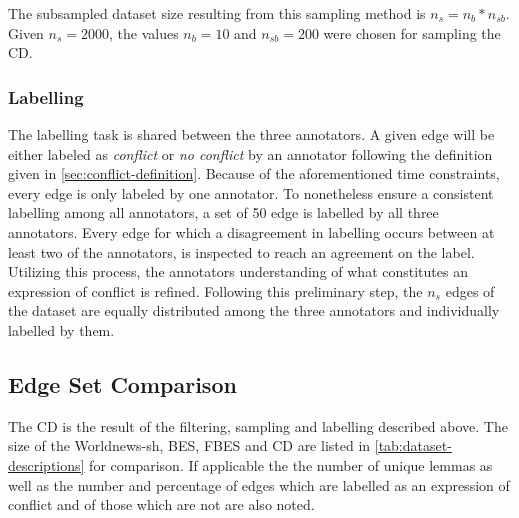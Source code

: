 \documentclass[11pt]{scrreprt}
\begin{document}
{The subsampled dataset size resulting from this sampling method is \(n_{s} = n_{b} * n_{sb}\). Given \(n_{s} = 2000\), the values \(n_b = 10\) and \(n_{sb} = 200\) were chosen for sampling the CD.


\subsubsection{Labelling}
The labelling task is shared between the three annotators. A given edge will be either labeled as \textit{conflict} or \textit{no conflict} by an annotator following the definition given in \cref{sec:conflict-definition}. Because of the aforementioned time constraints, every edge is only labeled by one annotator. To nonetheless ensure a consistent labelling among all annotators, a set of 50 edge is labelled by all three annotators. Every edge for which a disagreement in labelling occurs between at least two of the annotators, is inspected to reach an agreement on the label. Utilizing this process, the annotators understanding of what constitutes an expression of conflict is refined. Following this preliminary step, the \(n_s\) edges of the dataset are equally distributed among the three annotators and individually labelled by them.


\subsection{Edge Set Comparison}
The CD is the result of the filtering, sampling and labelling described above. The size of the Worldnews-\gls{sh}, BES, FBES and CD are listed in \cref{tab:dataset-descriptions} for comparison. If applicable the the number of unique lemmas as well as the number and percentage of edges which are labelled as an expression of conflict and of those which are not are also noted.


}
\end{document}
